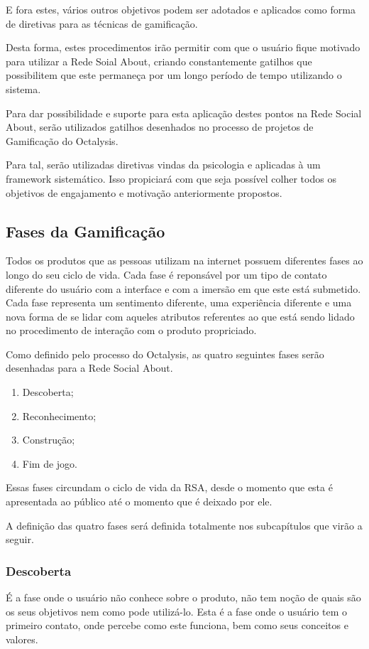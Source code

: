 E fora
estes, vários outros  objetivos podem ser adotados e aplicados como forma
de diretivas para as técnicas de gamificação.

Desta forma, estes procedimentos irão permitir com que o usuário fique motivado
para utilizar a Rede Soial About, criando constantemente gatilhos que possibilitem
que este permaneça por um longo período de tempo utilizando o sistema.

Para dar possibilidade e suporte para esta aplicação destes pontos na Rede
Social About, serão utilizados gatilhos desenhados no processo de projetos
de Gamificação do Octalysis.

Para tal, serão utilizadas diretivas vindas da psicologia e aplicadas à um
framework sistemático. Isso propiciará com que seja possível colher
todos os objetivos de engajamento e motivação anteriormente propostos.

\subsection{Fases da Gamificação}
\label{sub:fasesgamifição}
Todos os produtos que as pessoas utilizam na internet possuem diferentes
fases ao longo do seu ciclo de vida. Cada fase é reponsável por um tipo de contato diferente 
do usuário com a interface e com a imersão em que este está submetido.
Cada fase representa um sentimento diferente, uma experiência diferente
e uma nova forma de se lidar com aqueles atributos referentes ao que está
sendo lidado no procedimento de interação com o produto propriciado.

Como definido pelo processo do Octalysis, as quatro seguintes fases serão
desenhadas para a Rede Social About.

\begin{enumerate}
    \item Descoberta;
    \item Reconhecimento;
    \item Construção;
    \item Fim de jogo.
\end{enumerate}

Essas fases circundam o ciclo de vida da RSA, desde o momento que esta
é apresentada ao público até o momento que é deixado por ele. 

A definição das quatro fases será definida totalmente nos subcapítulos que virão  a seguir.

\subsubsection{Descoberta}
\label{sub:descoperta}
É a fase onde o usuário não conhece sobre o produto, não tem noção de quais são os
seus objetivos nem como pode utilizá-lo. Esta é a fase onde o usuário tem o primeiro
contato, onde percebe como este funciona, bem como seus conceitos e valores.

